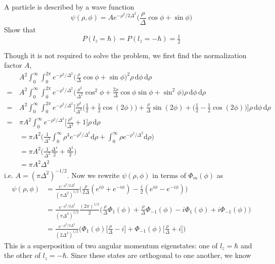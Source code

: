 \documentclass[../principles-of-quantum-mechanics.tex]{subfiles}
\begin{document}
\begin{questions}
	\question A particle is described by a wave function
	$$\psi(\rho, \phi) = Ae^{-\rho^2/2\Delta^2}\Big(\frac{\rho}{\Delta}\cos\phi + \sin\phi\Big)$$
	Show that
	$$P(l_z = \hbar) = P(l_z = -\hbar) = \tfrac{1}{2}$$
	\begin{solution}
		Though it is not required to solve the problem, we first find the normalization factor $A$,
		\begin{align*}
			&A^2\int_0^\infty\!\!\!\int_0^{2\pi}e^{-\rho^2/\Delta^2}\Big(\frac{\rho}{\Delta}\cos\phi + \sin\phi\Big)^2\rho\,\mathrm{d}\phi\,\mathrm{d}\rho \\ =\,&A^2\int_0^\infty\!\!\!\int_0^{2\pi}e^{-\rho^2/\Delta^2}\Big(\frac{\rho^2}{\Delta^2}\cos^2\phi + \frac{2\rho}{\Delta}\cos\phi\sin\phi + \sin^2\phi\Big)\rho\,\mathrm{d}\phi\,\mathrm{d}\rho \\
			=\,&A^2\int_0^\infty\!\!\!\int_0^{2\pi}e^{-\rho^2/\Delta^2}\Big[\frac{\rho^2}{\Delta^2}\Big(\frac{1}{2} + \frac{1}{2}\cos(2\phi)\Big) + \frac{\rho}{\Delta}\sin(2\phi) + \Big(\frac{1}{2} - \frac{1}{2}\cos(2\phi)\Big)\Big]\rho\,\mathrm{d}\phi\,\mathrm{d}\rho \\
			=\,&\pi A^2\int_0^\infty e^{-\rho^2/\Delta^2}\Big[\frac{\rho^2}{\Delta^2} + 1\Big]\rho\,\mathrm{d}\rho \\
			&= \pi A^2\Big(\frac{1}{\Delta^2}\int_0^\infty\rho^3e^{-\rho^2/\Delta^2}\mathrm{d}\rho + \int_0^\infty \rho e^{-\rho^2/\Delta^2}\mathrm{d}\rho\Big) \\
			&= \pi A^2 \Big(\frac{1}{\Delta^2}\frac{\Delta^4}{2} + \frac{\Delta^2}{2}\Big) \\
			&= \pi A^2\Delta^2
		\end{align*}
		i.e. $A = (\pi\Delta^2)^{-1/2}$. Now we rewrite $\psi(\rho, \phi)$ in terms of $\Phi_m(\phi)$ as
		\begin{align*}
			\psi(\rho, \phi) &= \frac{e^{-\rho^2/2\Delta^2}}{(\pi\Delta^2)^{1/2}}\Big(\frac{\rho}{2\Delta}(e^{i\phi} + e^{-i\phi}) - \frac{i}{2}(e^{i\phi} - e^{-i\phi})\Big) \\
			&= \frac{e^{-\rho^2/2\Delta^2}}{(\pi\Delta^2)^{1/2}}\frac{(2\pi)^{1/2}}{2}\Big(\frac{\rho}{\Delta}\Phi_1(\phi) + \frac{\rho}{\Delta}\Phi_{-1}(\phi) - i\Phi_1(\phi) + i\Phi_{-1}(\phi)\Big) \\
			&= \frac{e^{-\rho^2/2\Delta^2}}{(2\Delta^2)^{1/2}}\Big(\Phi_1(\phi)\Big[\frac{\rho}{\Delta} - i\Big] + \Phi_{-1}(\phi)\Big[\frac{\rho}{\Delta} + i\Big]\Big)
		\end{align*}
		This is a superposition of two angular momentum eigenstates: one of $l_z = \hbar$ and the other of $l_z = -\hbar$. Since these states are orthogonal to one another, we know

\end{solution}
\end{questions}
\end{document}
